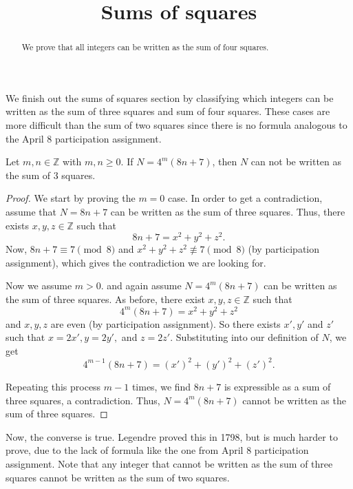 \documentclass{ximera}
\title{Sums of squares}
\begin{document}
  
\begin{abstract}  We prove that all integers can be written as the sum of four squares.
\end{abstract}
\maketitle  

We finish out the sums of squares section by classifying which integers can be written as the sum of three squares and sum of four squares. These cases are more difficult than the sum of two squares since there is no formula analogous to the April 8 participation assignment.

\begin{theorem}
Let $m,n\in\mathbb{Z}$ with $m,n\geq0$. If $N=4^m(8n+7)$, then $N$ can not be written as the sum of $3$ squares.
\end{theorem}
\begin{proof}
 We start by proving the $m=0$ case. In order to get a contradiction, assume that $N=8n+7$ can be written as the sum of three squares. Thus, there exists $x,y,z\in\mathbb{Z}$ such that \[8n+7=x^2+y^2+z^2.\]
 Now, $8n+7\equiv 7\pmod8$ and $x^2+y^2+z^2\not\equiv7\pmod 8$ (by participation assignment), which gives the contradiction we are looking for.

Now we assume $m>0$. and again assume $N=4^m(8n+7)$ can be written as the sum of three squares. As before, there exist $x,y,z\in\mathbb{Z}$ such that \[4^m(8n+7)=x^2+y^2+z^2\] and $x,y,z$ are even (by participation assignment). So there exists $x',y'$ and $z'$ such that $x=2x', y=2y',$ and $z=2z'$. Substituting into our definition of $N$, we get \[4^{m-1}(8n+7)=(x')^2+(y')^2+(z')^2.\]

Repeating  this process $m-1$ times, we find $8n+7$ is expressible as a sum of three squares, a contradiction. Thus, $N=4^m(8n+7)$ cannot be written as the sum of three squares.
\end{proof}

Now, the converse is true. Legendre proved this in 1798, but is much harder to prove, due to the lack of formula like the one from April 8 participation assignment. Note that any integer that cannot be written as the sum of three squares cannot be written as the sum of two squares.
\end{document}
